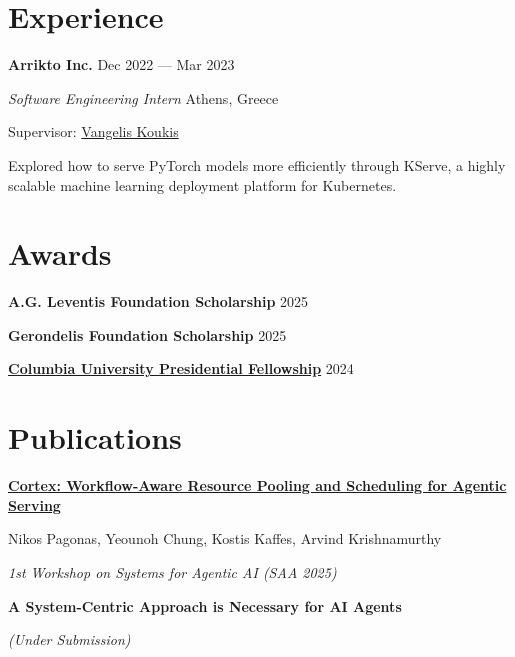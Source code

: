 \documentclass[margin,11pt]{resume}
\newcommand{\cvName}{Nikos Pagonas}
\newcommand{\descriptionVSpace}{\vspace{0.5ex}\xspace}
\newcommand{\subsectionVSpace}{\vspace{3.5ex}\xspace}
\newcommand{\sectionVSpace}{\vspace{1ex}\xspace} %
\newcommand{\sectionVSpaceCorrection}{\vspace{-3.5ex}} %
\newcommand{\header}[1]{\textbf{#1}\xspace}
\newcommand{\authors}[1]{#1\xspace}
\newcommand{\company}[1]{\header{#1}\xspace}
\newcommand{\equalContributionNote}{(*equal contribution)\xspace}
\newcommand{\fellowship}[1]{\header{#1}\xspace}
\newcommand{\interval}[2]{#1 --- #2\xspace}
\newcommand{\me}{\cvName\xspace}
\newcommand{\paperTitle}[1]{\header{#1}\xspace}
\newcommand{\place}[1]{#1\xspace}
\newcommand{\role}[1]{\textit{#1}\xspace}
\newcommand{\stitle}[1]{#1:\xspace}
\newcommand{\underSubmission}{\textit{(Under Submission)}\xspace}
\newcommand{\venue}[1]{\textit{#1}\xspace}
\newenvironment{rSubsection}{}{\par\subsectionVSpace}
\newenvironment{rSection}[1]{\sectionVSpaceCorrection\section{#1}\xspace}{\sectionVSpace\par}
\newenvironment{jobDuties}{\descriptionVSpace}{\par}
\begin{document}
\begin{resume}
\begin{rSection}{Experience}
		\begin{rSubsection}
			\company{Arrikto Inc.} \hfill \interval{Dec 2022}{Mar 2023}

			\role{Software Engineering Intern} \hfill \place{Athens, Greece}

			\stitle{Supervisor} \href{https://www.linkedin.com/in/vkoukis/}{Vangelis Koukis}

			\begin{jobDuties}
				Explored how to serve PyTorch models more efficiently through KServe, a highly scalable machine learning deployment platform for Kubernetes.
			\end{jobDuties}
		\end{rSubsection}
	\end{rSection}


	\begin{rSection}{Awards}
		\begin{rSubsection}
			\fellowship{A.G. Leventis Foundation Scholarship} \hfill 2025
		\end{rSubsection}

		\begin{rSubsection}
			\fellowship{Gerondelis Foundation Scholarship} \hfill 2025
		\end{rSubsection}

		\begin{rSubsection}
			\fellowship{\href{https://www.cs.columbia.edu/2024/meet-the-scholars-phd-students-with-prestigious-fellowships/}{Columbia University Presidential Fellowship}} \hfill 2024
		\end{rSubsection}
	\end{rSection}

	\begin{rSection}{Publications}
		\begin{rSubsection}
			\href{https://saa2025.github.io/papers/saa25-final5.pdf}{\paperTitle{Cortex: Workflow-Aware Resource Pooling and Scheduling for Agentic Serving}}

			\authors{\me, Yeounoh Chung, Kostis Kaffes, Arvind Krishnamurthy}

			\venue{1st Workshop on Systems for Agentic AI (SAA 2025)}
		\end{rSubsection}

		\begin{rSubsection}
			\paperTitle{A System-Centric Approach is Necessary for AI Agents}

			\underSubmission



\end{rSubsection}
\end{rSection}
\end{resume}
\end{document}
